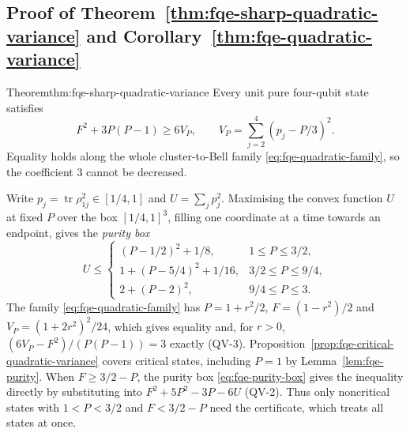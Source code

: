 \subsection{Proof of Theorem~\ref{thm:fqe-sharp-quadratic-variance} and Corollary~\ref{thm:fqe-quadratic-variance}}\label{sec:sup-qk}
\begin{restated}{Theorem}{thm:fqe-sharp-quadratic-variance}
Every unit pure four-qubit state satisfies
\[
\boxed{\qquad F^2+3P(P-1)\ge6V_P,
\qquad V_P=\sum_{j=2}^4(p_j-P/3)^2.\qquad}
\tag{QV}
\]
Equality holds along the whole cluster-to-Bell family \eqref{eq:fqe-quadratic-family}, so the
coefficient $3$ cannot be decreased.
\end{restated}
Write $p_j=\operatorname{tr}\rho_{1j}^2\in[1/4,1]$ and $U=\sum_jp_j^2$. Maximising the convex function $U$ at fixed
$P$ over the box $[1/4,1]^3$, filling one coordinate at a time towards an endpoint, gives the \emph{purity box}
\[
U\le
\begin{cases}
(P-1/2)^2+1/8,&1\le P\le3/2,\\
1+(P-5/4)^2+1/16,&3/2\le P\le9/4,\\
2+(P-2)^2,&9/4\le P\le3.
\end{cases}
\tag{JB}\label{eq:fqe-purity-box}
\]
The family \eqref{eq:fqe-quadratic-family} has $P=1+r^2/2$, $F=(1-r^2)/2$ and $V_P=(1+2r^2)^2/24$, which gives
equality and, for $r>0$, $(6V_P-F^2)/(P(P-1))=3$ exactly (QV-3). Proposition~\ref{prop:fqe-critical-quadratic-variance}
covers critical states, including $P=1$ by Lemma~\ref{lem:fqe-purity}. When $F\ge3/2-P$, the purity box
\eqref{eq:fqe-purity-box} gives the inequality directly by substituting into $F^2+5P^2-3P-6U$ (QV-2).
Thus only noncritical states with $1<P<3/2$ and $F<3/2-P$ need the certificate, which
treats all states at once.

